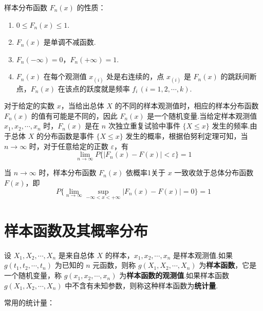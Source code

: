 样本分布函数 $F_n(x)$ 的性质：

\begin{enumerate}
    \item $0 \leqslant F_n(x) \leqslant 1$.
    \item $F_n(x)$ 是单调不减函数.
    \item $F_n(-\infty) = 0$，$F_n(+\infty) = 1$.
    \item $F_n(x)$ 在每个观测值 $x_{(i)}$ 处是右连续的，点 $x_{(i)}$ 是 $F_n(x)$ 的跳跃间断点，$F_n(x)$ 在该点的跃度就是频率 $f_i \, (i=1,2,\cdots,k)$.
\end{enumerate}

对于给定的实数 $x$，当给出总体 $X$ 的不同的样本观测值时，相应的样本分布函数 $F_n(x)$ 的值有可能是不同的，因此 $F_n(x)$ 是一个随机变量.当给定样本观测值 $x_1,x_2,\cdots,x_n$ 时，$F_n(x)$ 是在 $n$ 次独立重复试验中事件 $\{ X \leqslant x \}$ 发生的频率.由于总体 $X$ 的分布函数是事件 $\{ X \leqslant x \}$ 发生的概率，根据伯努利定理可知，当 $n \to \infty$ 时，对于任意给定的正数 $\varepsilon$，有
$$
\lim_{n \to \infty} P \{ |F_n(x) - F(x)| < \varepsilon \} = 1
$$

\begin{theorem}[][格利文科定理]
    当 $n \to \infty$ 时，样本分布函数 $F_n(x)$ 依概率1关于 $x$ 一致收敛于总体分布函数 $F(x)$，即
    $$
    P \{ \lim_{n \to \infty} \sup_{-\infty < x < +\infty} |F_n(x) - F(x)| = 0 \} = 1
    $$
\end{theorem}

\section{样本函数及其概率分布}

\begin{definition}
    设 $X_1,X_2,\cdots,X_n$ 是来自总体 $X$ 的样本，$x_1,x_2,\cdots,x_n$ 是样本观测值.如果 $g(t_1,t_2,\cdots,t_n)$ 为已知的 $n$ 元函数，则称 $g(X_1,X_2,\cdots,X_n)$ 为\textbf{样本函数}，它是一个随机变量，称 $g(x_1,x_2,\cdots,x_n)$ 为\textbf{样本函数的观测值}.如果样本函数 $g(X_1,X_2,\cdots,X_n)$ 中不含有未知参数，则称这种样本函数为\textbf{统计量}.
\end{definition}

常用的统计量：

